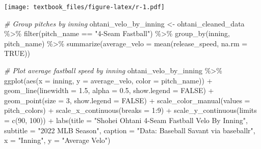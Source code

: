 \documentclass[
  11pt,
]{book}
\newenvironment{Shaded}{\begin{snugshade}}{\end{snugshade}}
\newcommand{\AttributeTok}[1]{\textcolor[rgb]{0.77,0.63,0.00}{#1}}
\newcommand{\CommentTok}[1]{\textcolor[rgb]{0.56,0.35,0.01}{\textit{#1}}}
\newcommand{\ConstantTok}[1]{\textcolor[rgb]{0.00,0.00,0.00}{#1}}
\newcommand{\DecValTok}[1]{\textcolor[rgb]{0.00,0.00,0.81}{#1}}
\newcommand{\FloatTok}[1]{\textcolor[rgb]{0.00,0.00,0.81}{#1}}
\newcommand{\FunctionTok}[1]{\textcolor[rgb]{0.00,0.00,0.00}{#1}}
\newcommand{\NormalTok}[1]{#1}
\newcommand{\OtherTok}[1]{\textcolor[rgb]{0.56,0.35,0.01}{#1}}
\newcommand{\SpecialCharTok}[1]{\textcolor[rgb]{0.00,0.00,0.00}{#1}}
\newcommand{\StringTok}[1]{\textcolor[rgb]{0.31,0.60,0.02}{#1}}
\theoremstyle{definition}
\theoremstyle{definition}
\theoremstyle{definition}
\theoremstyle{definition}
\theoremstyle{remark}
\begin{document}
\texttt{[image: textbook\_files/figure-latex/r-1.pdf]}

\newpage

\begin{Shaded}
\begin{Highlighting}[]
\CommentTok{\# Group pitches by inning}
\NormalTok{ohtani\_velo\_by\_inning }\OtherTok{\textless{}{-}}\NormalTok{ ohtani\_cleaned\_data }\SpecialCharTok{\%\textgreater{}\%} 
  \FunctionTok{filter}\NormalTok{(pitch\_name }\SpecialCharTok{==} \StringTok{"4{-}Seam Fastball"}\NormalTok{) }\SpecialCharTok{\%\textgreater{}\%} 
  \FunctionTok{group\_by}\NormalTok{(inning, pitch\_name) }\SpecialCharTok{\%\textgreater{}\%} 
  \FunctionTok{summarize}\NormalTok{(}\AttributeTok{average\_velo =} \FunctionTok{mean}\NormalTok{(release\_speed, }\AttributeTok{na.rm =} \ConstantTok{TRUE}\NormalTok{))}

\CommentTok{\# Plot average fastball speed by inning}
\NormalTok{ohtani\_velo\_by\_inning }\SpecialCharTok{\%\textgreater{}\%} 
  \FunctionTok{ggplot}\NormalTok{(}\FunctionTok{aes}\NormalTok{(}\AttributeTok{x =}\NormalTok{ inning, }\AttributeTok{y =}\NormalTok{ average\_velo, }\AttributeTok{color =}\NormalTok{ pitch\_name)) }\SpecialCharTok{+}
  \FunctionTok{geom\_line}\NormalTok{(}\AttributeTok{linewidth =} \FloatTok{1.5}\NormalTok{, }\AttributeTok{alpha =} \FloatTok{0.5}\NormalTok{, }\AttributeTok{show.legend =} \ConstantTok{FALSE}\NormalTok{) }\SpecialCharTok{+}
  \FunctionTok{geom\_point}\NormalTok{(}\AttributeTok{size =} \DecValTok{3}\NormalTok{, }\AttributeTok{show.legend =} \ConstantTok{FALSE}\NormalTok{) }\SpecialCharTok{+}
  \FunctionTok{scale\_color\_manual}\NormalTok{(}\AttributeTok{values =}\NormalTok{ pitch\_colors) }\SpecialCharTok{+}
  \FunctionTok{scale\_x\_continuous}\NormalTok{(}\AttributeTok{breaks =} \DecValTok{1}\SpecialCharTok{:}\DecValTok{9}\NormalTok{) }\SpecialCharTok{+}
  \FunctionTok{scale\_y\_continuous}\NormalTok{(}\AttributeTok{limits =} \FunctionTok{c}\NormalTok{(}\DecValTok{90}\NormalTok{, }\DecValTok{100}\NormalTok{)) }\SpecialCharTok{+}
  \FunctionTok{labs}\NormalTok{(}\AttributeTok{title =} \StringTok{"Shohei Ohtani 4{-}Seam Fastball Velo By Inning"}\NormalTok{,}
       \AttributeTok{subtitle =} \StringTok{"2022 MLB Season"}\NormalTok{,}
       \AttributeTok{caption =} \StringTok{"Data: Baseball Savant via baseballr"}\NormalTok{,}
       \AttributeTok{x =} \StringTok{"Inning"}\NormalTok{,}
       \AttributeTok{y =} \StringTok{"Average Velo"}\NormalTok{)}
\end{Highlighting}
\end{Shaded}
\end{document}
